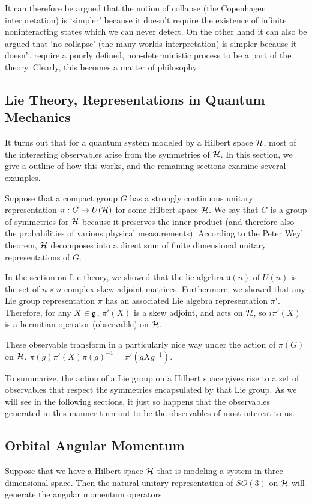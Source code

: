 \documentclass[a4paper]{article}
\begin{document}
It can therefore be argued that the notion of collapse (the Copenhagen interpretation) is `simpler' because it doesn't require the existence of infinite noninteracting states which we can never detect. On the other hand it can also be argued that `no collapse' (the many worlds interpretation) is simpler because it doesn't require a poorly defined, non-deterministic process to be a part of the theory. Clearly, this becomes a matter of philosophy.

\subsection{Lie Theory, Representations in Quantum Mechanics}
It turns out that for a quantum system modeled by a Hilbert space $\mathcal{H}$, most of the interesting observables arise from the symmetries of $\mathcal{H}$. In this section, we give a outline of how this works, and the remaining sections examine several examples.

Suppose that a compact group $G$ has a strongly continuous unitary representation $\pi: G \to U(\mathcal{H})$ for some Hilbert space $\mathcal{H}$. We say that $G$ is a group of symmetries for $\mathcal{H}$ because it preserves the inner product (and therefore also the probabilities of various physical measurements). According to the Peter Weyl theorem, $\mathcal{H}$ decomposes into a direct sum of finite dimensional unitary representations of $G$.  

In the section on Lie theory, we showed that the lie algebra $\mathfrak{u}(n)$ of $U(n)$ is the set of $n \times n$ complex skew adjoint matrices. Furthermore, we showed that any Lie group representation $\pi$ has an associated Lie algebra representation $\pi'$. Therefore, for any $X \in \mathfrak{g}$, $\pi'(X)$ is a skew adjoint, and acts on $\mathcal{H}$, so $i\pi'(X)$ is a hermitian operator (observable) on $\mathcal{H}$. 

These observable transform in a particularly nice way under the action of $\pi(G)$ on $\mathcal{H}$. $\pi(g)\pi'(X)\pi(g)^{-1} = \pi'(gXg^{-1})$.

To summarize, the action of a Lie group on a Hilbert space gives rise to a set of observables that respect the symmetries encapsulated by that Lie group. As we will see in the following sections, it just so happens that the observables generated in this manner turn out to be the observables of most interest to us.

\subsection{Orbital Angular Momentum}
Suppose that we have a Hilbert space $\mathcal{H}$ that is modeling a system in three dimensional space. Then the natural unitary representation of $SO(3)$ on $\mathcal{H}$ will generate the angular momentum operators. 
\end{document}

